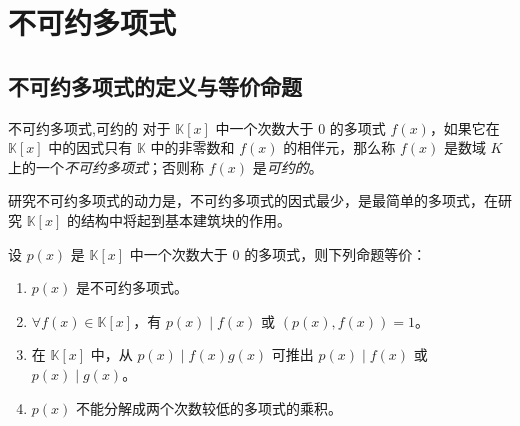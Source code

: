 
\section{不可约多项式}

\subsection{不可约多项式的定义与等价命题}

\begin{definition}{不可约多项式,可约的}
	对于 $\mathbb K[x]$ 中一个次数大于 $0$ 的多项式 $f(x)$，如果它在 $\mathbb K[x]$ 中的因式只有 $\mathbb K$ 中的非零数和 $f(x)$ 的相伴元，那么称 $f(x)$ 是数域 $K$ 上的一个\emph{不可约多项式}；否则称 $f(x)$ 是\emph{可约的}。
\end{definition}

研究不可约多项式的动力是，不可约多项式的因式最少，是最简单的多项式，在研究 $\mathbb K[x]$ 的结构中将起到基本建筑块的作用。

\begin{proposition}
	设 $p(x)$ 是 $\mathbb K[x]$ 中一个次数大于 $0$ 的多项式，则下列命题等价：

	\begin{enumerate}
		\item $p(x)$ 是不可约多项式。
		\item $\forall f(x) \in \mathbb K[x]$，有 $p(x) \mid f(x)$ 或 $(p(x), f(x)) = 1$。
		\item 在 $\mathbb K[x]$ 中，从 $p(x) \mid f(x) g(x)$ 可推出 $p(x) \mid f(x)$ 或 $p(x) \mid g(x)$。
		\item $p(x)$ 不能分解成两个次数较低的多项式的乘积。
	\end{enumerate}
\end{proposition}

